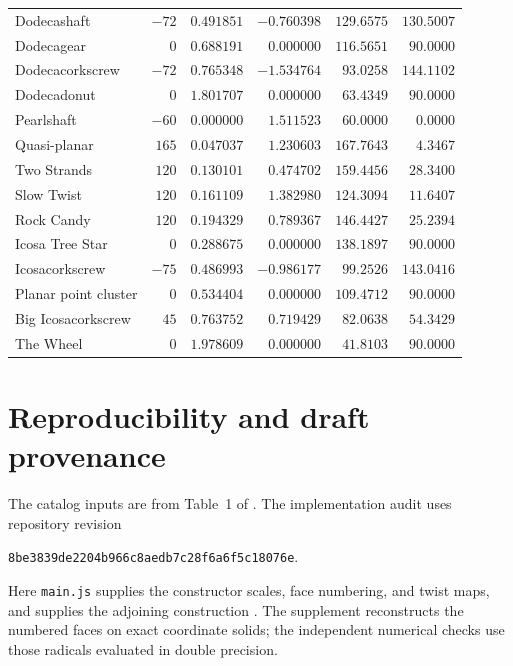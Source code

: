 \documentclass[11pt]{article}
\theoremstyle{definition}
\begin{document}
\begin{longtable}{@{}lrrrrr@{}}
Dodecashaft & $-72$ & $0.491851$ & $-0.760398$ & $129.6575$ & $130.5007$\\
Dodecagear & $0$ & $0.688191$ & $0.000000$ & $116.5651$ & $90.0000$\\
Dodecacorkscrew & $-72$ & $0.765348$ & $-1.534764$ & $93.0258$ & $144.1102$\\
Dodecadonut & $0$ & $1.801707$ & $0.000000$ & $63.4349$ & $90.0000$\\
\addlinespace[0.4em]
Pearlshaft & $-60$ & $0.000000$ & $1.511523$ & $60.0000$ & $0.0000$\\
Quasi-planar & $165$ & $0.047037$ & $1.230603$ & $167.7643$ & $4.3467$\\
Two Strands & $120$ & $0.130101$ & $0.474702$ & $159.4456$ & $28.3400$\\
Slow Twist & $120$ & $0.161109$ & $1.382980$ & $124.3094$ & $11.6407$\\
Rock Candy & $120$ & $0.194329$ & $0.789367$ & $146.4427$ & $25.2394$\\
Icosa Tree Star & $0$ & $0.288675$ & $0.000000$ & $138.1897$ & $90.0000$\\
Icosacorkscrew & $-75$ & $0.486993$ & $-0.986177$ & $99.2526$ & $143.0416$\\
Planar point cluster & $0$ & $0.534404$ & $0.000000$ & $109.4712$ & $90.0000$\\
Big Icosacorkscrew & $45$ & $0.763752$ & $0.719429$ & $82.0638$ & $54.3429$\\
The Wheel & $0$ & $1.978609$ & $0.000000$ & $41.8103$ & $90.0000$\\
\end{longtable}
\normalsize

\section{Reproducibility and draft provenance}\label{app:provenance}
The catalog inputs are from Table~1 of \cite{read2022}. The implementation
audit uses repository revision
\begin{center}\small\texttt{8be3839de2204b966c8aedb7c28f6a6f5c18076e}.\end{center}
Here \texttt{main.js} supplies the constructor scales, face numbering, and
twist maps, and  supplies the adjoining
construction \cite{repository}. The supplement reconstructs the numbered
faces on exact coordinate solids; the independent numerical checks use
those radicals evaluated in double precision.
\end{document}
